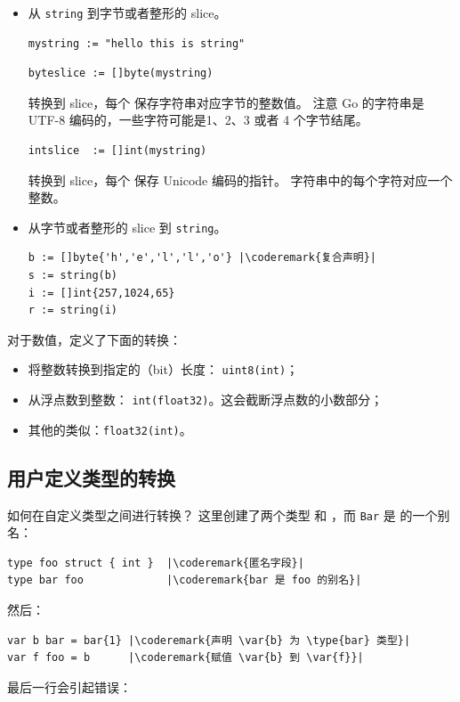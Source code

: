 \begin{itemize}
\item{
从 \lstinline{string} 到字节或者整形的 slice。
\begin{lstlisting}
mystring := "hello this is string"
\end{lstlisting}

\begin{lstlisting}
byteslice := []byte(mystring)
\end{lstlisting}
转换到  slice，每个  保存字符串对应字节的整数值。
注意 Go 的字符串是 UTF-8 编码的，一些字符可能是1、2、3 或者 4 个字节结尾。
\begin{lstlisting}
intslice  := []int(mystring)
\end{lstlisting}
转换到  slice，每个  保存 Unicode 编码的指针。
字符串中的每个字符对应一个整数。
}
\item{
从字节或者整形的 slice 到 \lstinline{string}。
\begin{lstlisting}
b := []byte{'h','e','l','l','o'} |\coderemark{复合声明}|
s := string(b)
i := []int{257,1024,65} 
r := string(i)
\end{lstlisting}
}
\end{itemize}
对于数值，定义了下面的转换：
\begin{itemize}
\item{将整数转换到指定的（bit）长度： 
\lstinline{uint8(int)}；}
\item{从浮点数到整数：
\lstinline{int(float32)}。这会截断浮点数的小数部分；}
\item{其他的类似：\lstinline{float32(int)}。}
\end{itemize}

\subsection{用户定义类型的转换}
如何在自定义类型之间进行转换？
这里创建了两个类型  和 ，而
\lstinline{Bar} 是  的一个别名：
\begin{lstlisting}
type foo struct { int }  |\coderemark{匿名字段}|
type bar foo             |\coderemark{bar 是 foo 的别名}|
\end{lstlisting}

然后：
\begin{lstlisting}
var b bar = bar{1} |\coderemark{声明 \var{b} 为 \type{bar} 类型}|
var f foo = b	   |\coderemark{赋值 \var{b} 到 \var{f}}|
\end{lstlisting}
最后一行会引起错误：

